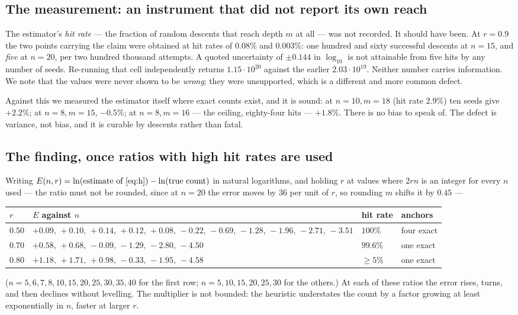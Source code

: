 \documentclass[11pt,a4paper]{article}
\begin{document}
\subsection*{The measurement: an instrument that did not report its own reach}
The estimator's \emph{hit rate} --- the fraction of random descents that reach depth $m$ at all
--- was not recorded.  It should have been.  At $r=0.9$ the two points carrying the claim were
obtained at hit rates of $0.08\%$ and $0.003\%$: one hundred and sixty successful descents at
$n=15$, and \emph{five} at $n=20$, per two hundred thousand attempts.  A quoted uncertainty of
$\pm0.144$ in $\log_{10}$ is not attainable from five hits by any number of seeds.  Re-running
that cell independently returns $1.15\cdot10^{20}$ against the earlier $2.03\cdot10^{19}$.
Neither number carries information.  We note that the values were never shown to be
\emph{wrong}; they were unsupported, which is a different and more common defect.

Against this we measured the estimator itself where exact counts exist, and it is sound:
at $n{=}10,m{=}18$ (hit rate $2.9\%$) ten seeds give $+2.2\%$; at $n{=}8,m{=}15$, $-0.5\%$; at
$n{=}8,m{=}16$ --- the ceiling, eighty-four hits --- $+1.8\%$.  There is no bias to speak of.
The defect is variance, not bias, and it is curable by descents rather than fatal.

\subsection*{The finding, once ratios with high hit rates are used}
Writing $E(n,r)=\ln(\text{estimate of \eqref{eq:h}})-\ln(\text{true count})$ in natural
logarithms, and holding $r$ at values where $2rn$ is an integer for every $n$ used --- the ratio
must not be rounded, since at $n=20$ the error moves by $36$ per unit of $r$, so rounding $m$
shifts it by $0.45$ ---
\begin{center}
\begin{tabular}{llll}
\toprule
$r$ & $E$ against $n$ & hit rate & anchors\\
\midrule
$0.50$ & $+0.09,\,+0.10,\,+0.14,\,+0.12,\,+0.08,\,-0.22,\,-0.69,\,-1.28,\,-1.96,\,-2.71,\,-3.51$ & $100\%$ & four exact\\
$0.70$ & $+0.58,\,+0.68,\,-0.09,\,-1.29,\,-2.80,\,-4.50$ & $99.6\%$ & one exact\\
$0.80$ & $+1.18,\,+1.71,\,+0.98,\,-0.33,\,-1.95,\,-4.58$ & $\ge5\%$ & one exact\\
\bottomrule
\end{tabular}
\end{center}
($n=5,6,7,8,10,15,20,25,30,35,40$ for the first row; $n=5,10,15,20,25,30$ for the others.)  At each of
these ratios the error rises, turns, and then declines without levelling.  The multiplier is not
bounded: the heuristic understates the count by a factor growing at least exponentially in $n$,
faster at larger $r$.
\end{document}
